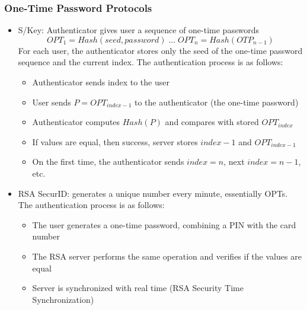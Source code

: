 \documentclass[10pt,a4paper]{report}
\begin{document}
\subsubsection{One-Time Password Protocols}
\begin{itemize}
\item S/Key: Authenticator gives user a sequence of one-time passwords
$$
OPT_1 = Hash(seed,password) \; ... \; OPT_n = Hash(OTP_{n-1})
$$
For each user, the authenticator stores only the seed of the one-time password sequence and the current index. The authentication process is as follows:
\begin{itemize}
\item Authenticator sends index to the user
\item User sends $P = OPT_{index-1}$ to the authenticator (the one-time password)
\item Authenticator computes $Hash(P)$ and compares with stored $OPT_{index}$
\item If values are equal, then success, server stores $index-1$ and $OPT_{index-1}$
\item On the first time, the authenticator sends $index = n$, next $index = n-1$, etc.
\end{itemize}
\item RSA SecurID: generates a unique number every minute, essentially OPTs. The authentication process is as follows:
\begin{itemize}
\item The user generates a one-time password, combining a PIN with the card number
\item The RSA server performs the same operation and verifies if the values are equal
\item Server is synchronized with real time (RSA Security Time Synchronization)
\end{itemize}
\end{itemize}
\end{document}
